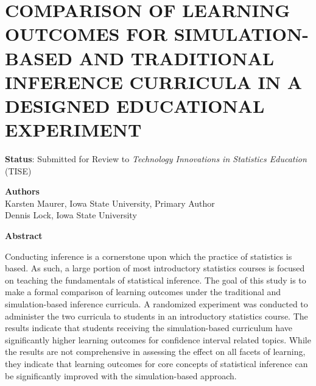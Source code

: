 \chapter{COMPARISON OF LEARNING OUTCOMES FOR SIMULATION-BASED AND TRADITIONAL INFERENCE CURRICULA IN A DESIGNED EDUCATIONAL EXPERIMENT}
\label{CurriculumStudy}
 
 
\begin{center}
\textbf{Status}: Submitted for Review to \textit{Technology Innovations in Statistics Education} (TISE)\\
\end{center} 

\begin{center}
\textbf{Authors}\\
Karsten Maurer, Iowa State University, Primary Author\\
Dennis Lock, Iowa State University
\end{center}


\begin{center}
\textbf{Abstract}\\
\end{center}

Conducting inference is a cornerstone upon which the practice of statistics is based. As such, a large portion of most introductory statistics courses is focused on teaching the fundamentals of statistical inference. The goal of this study is to make a formal comparison of learning outcomes under the traditional and simulation-based inference curricula. A randomized experiment was conducted to administer the two curricula to students in an introductory statistics course.  The results indicate that students receiving the simulation-based curriculum have significantly higher learning outcomes for confidence interval related topics. While the results are not comprehensive in assessing the effect on all facets of learning, they indicate that learning outcomes for core concepts of statistical inference can be significantly improved with the simulation-based approach. 

















